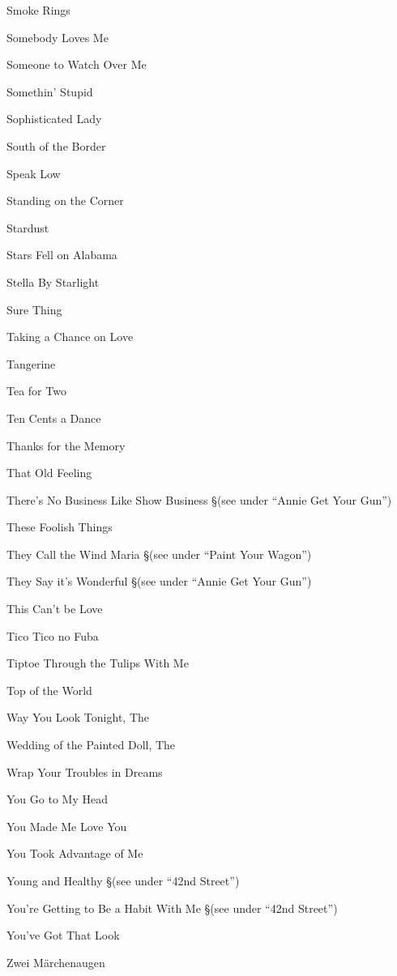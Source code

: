 \N Smoke Rings

\N Somebody Loves Me

\N Someone to Watch Over Me

\N Somethin' Stupid

\N Sophisticated Lady

\N South of the Border

\N Speak Low

\N Standing on the Corner

\N Stardust

\N Stars Fell on Alabama

\N Stella By Starlight

\N Sure Thing

\N Taking a Chance on Love

\N Tangerine

\N Tea for Two

\N Ten Cents a Dance

\N Thanks for the Memory

\N That Old Feeling

\N There's No Business Like Show Business
\nobreak
\S (see under ``Annie Get Your Gun'')

\N These Foolish Things

\N They Call the Wind Maria
\nobreak
\S (see under ``Paint Your Wagon'')

\N They Say it's Wonderful
\nobreak
\S (see under ``Annie Get Your Gun'')

\N This Can't be Love

\N Tico Tico no Fuba

\N Tiptoe Through the Tulips With Me

\N Top of the World

\N Way You Look Tonight, The

\N Wedding of the Painted Doll, The

\N Wrap Your Troubles in Dreams

\N You Go to My Head

\N You Made Me Love You

\N You Took Advantage of Me

\N Young and Healthy
\nobreak
\S (see under ``42nd Street'')

\N You're Getting to Be a Habit With Me
\nobreak
\S (see under ``42nd Street'')

\N You've Got That Look

\N Zwei M{\"a}rchenaugen

\singlecolumn


\bye
